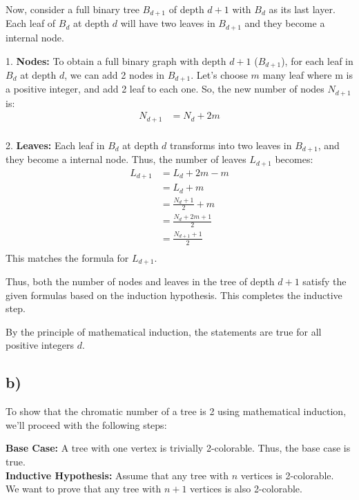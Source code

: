 \documentclass[12pt]{article}
\begin{document}
Now, consider a full binary tree \( B_{d+1} \) of depth \( d+1 \) with \( B_d \) as its last layer. Each leaf of \( B_d \) at depth \(d\) will have two leaves in \( B_{d+1} \) and they become a internal node.

1. \textbf{Nodes:} To obtain a full binary graph with depth \(d+1\) (\( B_{d+1} \)), for each leaf in \( B_d \) at depth \(d\), we can add 2 nodes in \( B_{d+1} \). Let's choose \(m\) many leaf where m is a positive integer, and add 2 leaf to each one. So, the new number of nodes \( N_{d+1} \) is:
\begin{align*}
N_{d+1} &= N_d + 2m \\
\end{align*}

2. \textbf{Leaves:} Each leaf in \( B_d \) at depth \(d\) transforms into two leaves in \( B_{d+1} \), and they become a internal node. Thus, the number of leaves \( L_{d+1} \) becomes:
\begin{align*}
L_{d+1} &= L_d + 2m - m\\
&= L_d + m \\
&= \frac{N_d + 1}{2} + m \\
&= \frac{N_d + 2m + 1}{2} \\
&= \frac{N_{d+1} + 1}{2} \\
\end{align*}
This matches the formula for \( L_{d+1} \).

Thus, both the number of nodes and leaves in the tree of depth \( d+1 \) satisfy the given formulas based on the induction hypothesis. This completes the inductive step.

By the principle of mathematical induction, the statements are true for all positive integers \( d \).


\subsection*{b)}

To show that the chromatic number of a tree is 2 using mathematical induction, we'll proceed with the following steps:

\textbf{Base Case:}
A tree with one vertex is trivially 2-colorable. Thus, the base case is true.\\

\textbf{Inductive Hypothesis:}
Assume that any tree with $n$ vertices is 2-colorable.\\

We want to prove that any tree with $n+1$ vertices is also 2-colorable.
\end{document}
